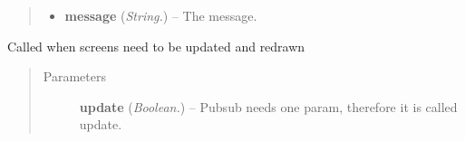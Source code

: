 \documentclass[letterpaper,10pt,english]{sphinxmanual}
\begin{document}
\begin{fulllineitems}
\begin{fulllineitems}
\begin{quote}
\begin{description}
\begin{itemize}
\item {} 
\textbf{message} (\emph{String.}) -- The message.

\end{itemize}

\end{description}\end{quote}

\end{fulllineitems}


\begin{fulllineitems}
\label{api:wos.GUI.UpdateScreens}
Called when screens need to be updated and redrawn
\begin{quote}\begin{description}
\item[{Parameters}] \leavevmode
\textbf{update} (\emph{Boolean.}) -- Pubsub needs one param, therefore it is called update.

\end{description}\end{quote}

\end{fulllineitems}


\end{fulllineitems}

\end{document}
